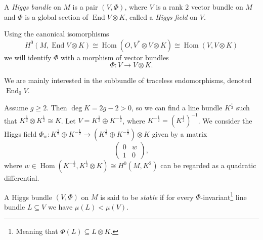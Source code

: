 \documentclass[A4paper, 12pt, british, reqno]{amsart}
\DeclareMathOperator{\Hom}{Hom}
\DeclareMathOperator{\End}{End}
\newcommand{\ot}{\otimes}
\newcommand{\op}{\oplus}
\newcommand{\dual}{^{*}}
\begin{document}
%
%
%

\begin{defn}
    A \textit{Higgs bundle} on $M$ is a pair $(V,\Phi)$, where $V$ is a rank $2$ vector bundle on $M$ and $\Phi$ is a global section of $\End{V}\ot K$, called a \textit{Higgs field} on $V$.
\end{defn}

\begin{rem}
    Using the canonical isomorphisms
    \[ H^{0}(M,\End{V}\ot K)\cong \Hom(O,V\dual \ot V\ot K)\cong \Hom(V,V\ot K) \]
    we will identify $\Phi$ with a morphism of vector bundles
    \[ \Phi\colon V\to V\ot K. \]
\end{rem}

\begin{rem}
    We are mainly interested in the subbundle of traceless endomorphisms, denoted $\End_{0}{V}$.
\end{rem}

\begin{exa}
    Assume $g\geqslant 2$.
    Then $\deg{K}=2g-2>0$, so we can find a line bundle $K^{\frac{1}{2}}$ such that $K^{\frac{1}{2}}\ot K^{\frac{1}{2}}\cong K$.
    Let $V=K^{\frac{1}{2}}\op K^{-\frac{1}{2}}$, where $K^{-\frac{1}{2}}=(K^{\frac{1}{2}})^{-1}$.
    We consider the Higgs field $\Phi_{w}\colon K^{\frac{1}{2}}\op K^{-\frac{1}{2}}\to (K^{\frac{1}{2}}\op K^{-\frac{1}{2}})\ot K$ given by a matrix
    \[
	\begin{pmatrix}
	    0 & w \\
	    1 & 0
	\end{pmatrix},
    \]
    where $w\in \Hom(K^{-\frac{1}{2}},K^{\frac{1}{2}}\ot K)\cong H^{0}(M,K^{2})$ can be regarded as a quadratic differential.
\end{exa}

\begin{defn}
    A Higgs bundle $(V,\Phi)$ on $M$ is said to be \textit{stable} if for every $\Phi$-invariant\footnote{Meaning that $\Phi(L)\subseteq L\ot K$.} line bundle $L\subseteq V$ we have $\mu(L)<\mu(V)$.
\end{defn}
\end{document}
